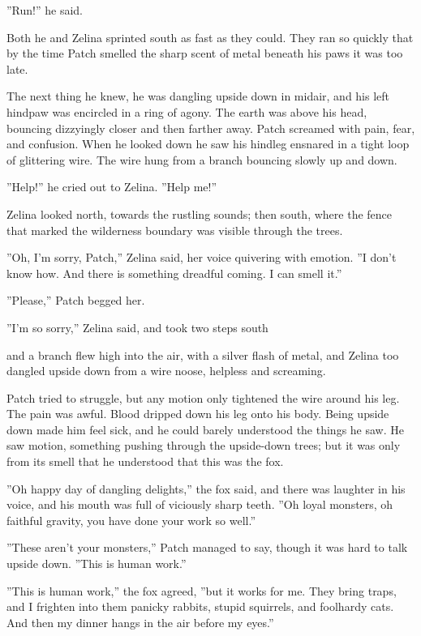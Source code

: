 \documentclass[11pt]{article}
\begin{document}
''Run!'' he said.\par
Both he and Zelina sprinted south as fast as they could. They ran so quickly that by the time Patch smelled the sharp scent of metal beneath his paws it was too late.\par
The next thing he knew, he was dangling upside down in midair, and his left hindpaw was encircled in a ring of agony. The earth was above his head, bouncing dizzyingly closer and then farther away. Patch screamed with pain, fear, and confusion. When he looked down he saw his hindleg ensnared in a tight loop of glittering wire. The wire hung from a branch bouncing slowly up and down.\par
''Help!'' he cried out to Zelina. ''Help me!''\par
Zelina looked north, towards the rustling sounds; then south, where the fence that marked the wilderness boundary was visible through the trees.\par
''Oh, I'm sorry, Patch,'' Zelina said, her voice quivering with emotion. ''I don't know how. And there is something dreadful coming. I can smell it.''\par
''Please,'' Patch begged her.\par
''I'm so sorry,'' Zelina said, and took two steps south %
\par
 and a branch flew high into the air, with a silver flash of metal, and Zelina too dangled upside down from a wire noose, helpless and screaming.\par
Patch tried to struggle, but any motion only tightened the wire around his leg. The pain was awful. Blood dripped down his leg onto his body. Being upside down made him feel sick, and he could barely understood the things he saw. He saw motion, something pushing through the upside-down trees; but it was only from its smell that he understood that this was the fox.\par
''Oh happy day of dangling delights,'' the fox said, and there was laughter in his voice, and his mouth was full of viciously sharp teeth. ''Oh loyal monsters, oh faithful gravity, you have done your work so well.''\par
''These aren't your monsters,'' Patch managed to say, though it was hard to talk upside down. ''This is human work.''\par
''This is human work,'' the fox agreed, ''but it works for me. They bring traps, and I frighten into them panicky rabbits, stupid squirrels, and foolhardy cats. And then my dinner hangs in the air before my eyes.''\par
\end{document}
